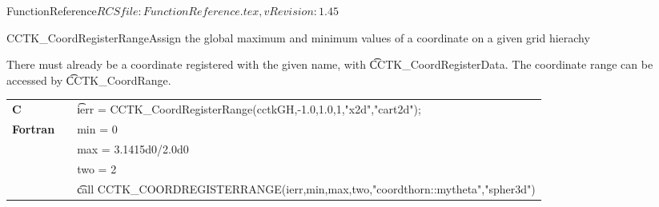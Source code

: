 \begin{cactuspart}{5}{FunctionReference}{$RCSfile: FunctionReference.tex,v $}{$Revision: 1.45 $}
\begin{CCTKFunc}{CCTK\_CoordRegisterRange}{Assign the global maximum and minimum
values of a coordinate on a given grid hierachy}
\label{CCTK-CoordRegisterRange}
\showargs
\begin{params}
\end{params}
\begin{discussion}
There must already
be a coordinate registered with the given name, with {\t CCTK\_CoordRegisterData}.
The coordinate range
can be accessed by {\t CCTK\_CoordRange}.
\end{discussion}
\begin{examples}
\begin{tabular}{@{}p{3cm}cp{11cm}}
\hfill {\bf C} && {\t ierr = CCTK\_CoordRegisterRange(cctkGH,-1.0,1.0,1,"x2d","cart2d")};
\\
\hfill {\bf Fortran} && min = 0
\\
&& max = 3.1415d0/2.0d0
\\
&& two = 2
\\
&&{\t call CCTK\_COORDREGISTERRANGE(ierr,min,max,two,"coordthorn::mytheta","spher3d")}
\\
\end{tabular}
\end{examples}
\begin{errorcodes}
\end{errorcodes}
\end{CCTKFunc}


\end{cactuspart}
